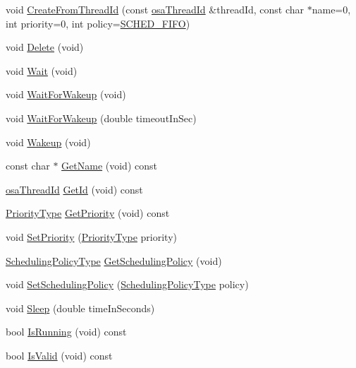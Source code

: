 \begin{DoxyCompactItemize}
\item 
void \hyperlink{classosa_thread_a080f9dbe273fad070d94a411684b4ca2}{Create\-From\-Thread\-Id} (const \hyperlink{classosa_thread_id}{osa\-Thread\-Id} \&thread\-Id, const char $\ast$name=0, int priority=0, int policy=\hyperlink{osa_thread_8h_ab998332c6538a029b4eed398b7a423da}{S\-C\-H\-E\-D\-\_\-\-F\-I\-F\-O})
\item 
void \hyperlink{classosa_thread_abc8c57e73e11e24c3b5203d520ecd877}{Delete} (void)
\item 
void \hyperlink{classosa_thread_a94895a862be656d41e113f64dfb6d274}{Wait} (void)
\item 
void \hyperlink{classosa_thread_adaa096f5ae24c775c7f3011affc251e2}{Wait\-For\-Wakeup} (void)
\item 
void \hyperlink{classosa_thread_a9a82d911b12b9a111527f90ba3793d82}{Wait\-For\-Wakeup} (double timeout\-In\-Sec)
\item 
void \hyperlink{classosa_thread_a6bdb340d306cbecfca251d5f8dcd7d50}{Wakeup} (void)
\item 
const char $\ast$ \hyperlink{classosa_thread_aacbb9a3ec74bc5d3ee924f986dd681d6}{Get\-Name} (void) const 
\item 
\hyperlink{classosa_thread_id}{osa\-Thread\-Id} \hyperlink{classosa_thread_a1700ab631890de1d6211eb9f635fc0cc}{Get\-Id} (void) const 
\item 
\hyperlink{osa_thread_8h_a118e6f24bad4e18e7d179bb41166ae8c}{Priority\-Type} \hyperlink{classosa_thread_a814d2d55a2c028fa282a6ed99e3bb068}{Get\-Priority} (void) const 
\item 
void \hyperlink{classosa_thread_afe4e333816d8d6c5765d61f03bd90a11}{Set\-Priority} (\hyperlink{osa_thread_8h_a118e6f24bad4e18e7d179bb41166ae8c}{Priority\-Type} priority)
\item 
\hyperlink{osa_thread_8h_a52b64f646398cfbb451b035825642724}{Scheduling\-Policy\-Type} \hyperlink{classosa_thread_a9e6f22030b4ef6c0c0eca6408696d3e0}{Get\-Scheduling\-Policy} (void)
\item 
void \hyperlink{classosa_thread_a58f2be5f8b86d296fae2061a16803f26}{Set\-Scheduling\-Policy} (\hyperlink{osa_thread_8h_a52b64f646398cfbb451b035825642724}{Scheduling\-Policy\-Type} policy)
\item 
void \hyperlink{classosa_thread_af7490cefd464c7ea87b287f70e4dc833}{Sleep} (double time\-In\-Seconds)
\item 
bool \hyperlink{classosa_thread_a3dbeece9c55c7730d229e715c3adf29f}{Is\-Running} (void) const 
\item 
bool \hyperlink{classosa_thread_ad0199fe60a017dac38be9b8211ea7206}{Is\-Valid} (void) const 
\end{DoxyCompactItemize}
